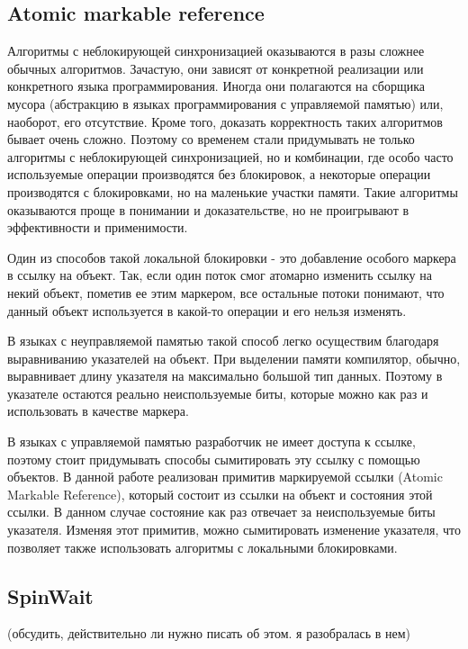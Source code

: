 \documentclass[12pt]{article}
\begin{document}
{			\subsection{Atomic markable reference}
				\par Алгоритмы с неблокирующей синхронизацией оказываются в разы сложнее обычных алгоритмов. Зачастую, они зависят от конкретной реализации или конкретного языка программирования. Иногда они полагаются на сборщика мусора (абстракцию в языках программирования с управляемой памятью) или, наоборот, его отсутствие. Кроме того, доказать корректность таких алгоритмов бывает очень сложно. Поэтому со временем стали придумывать не только алгоритмы с неблокирующей синхронизацией, но и комбинации, где особо часто используемые операции производятся без блокировок, а некоторые операции производятся с блокировками, но на маленькие участки памяти. Такие алгоритмы оказываются проще в понимании и доказательстве, но не проигрывают в эффективности и применимости.  
				\par Один из способов такой локальной блокировки - это добавление особого маркера в ссылку на объект. Так, если один поток смог атомарно изменить ссылку на некий объект, пометив ее этим маркером, все остальные потоки понимают, что данный объект используется в какой-то операции и его нельзя изменять. 
				\par В языках с неуправляемой памятью такой способ легко осуществим благодаря выравниванию указателей на объект. При выделении памяти компилятор, обычно, выравнивает длину указателя на максимально большой тип данных. Поэтому в указателе остаются реально неиспользуемые биты, которые можно как раз и использовать в качестве маркера.
				\par В языках с управляемой памятью разработчик не имеет доступа к ссылке, поэтому стоит придумывать способы сымитировать эту ссылку с помощью объектов. В данной работе реализован примитив маркируемой ссылки (Atomic Markable Reference), который состоит из ссылки на объект и состояния этой ссылки. В данном случае состояние как раз отвечает за неиспользуемые биты указателя. Изменяя этот примитив, можно сымитировать изменение указателя, что позволяет также использовать алгоритмы с локальными блокировками.			
			\subsection{SpinWait}
				\par (обсудить, действительно ли нужно писать об этом. я разобралась в нем)
		
}
\end{document}
